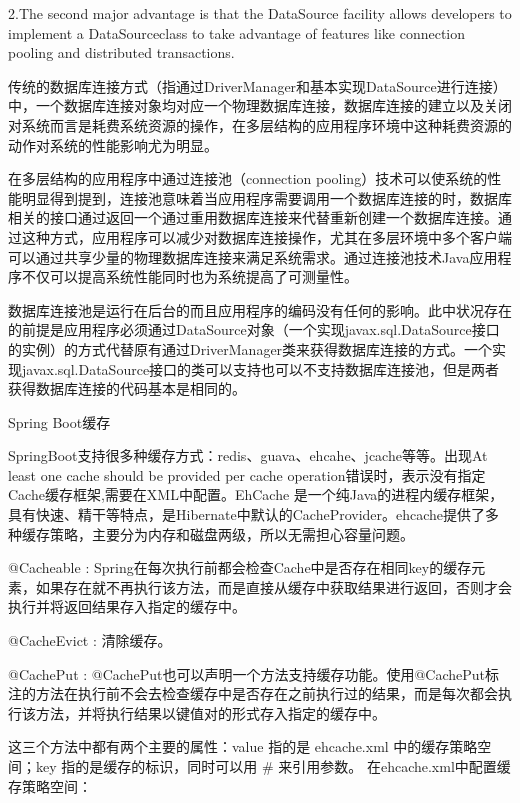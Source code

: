 \documentclass[11pt,fleqn]{book}
\makeatletter
\numberwithin{dummy}{section}
\theoremstyle{ocrenumbox}
\theoremstyle{blacknumex}
\theoremstyle{blacknumbox}
\theoremstyle{ocrenum}
\renewcommand{\subsection}{\@startsection {subsection}{2}{\z@}
	{-3ex \@plus -0.1ex \@minus -.4ex}
	{0.5ex \@plus.2ex }
	{\normalfont\sffamily\bfseries}}
\makeatother
\begin{document}
2.The second major advantage is that the DataSource facility allows developers to implement a DataSourceclass to take advantage of features like connection pooling and distributed transactions.

传统的数据库连接方式（指通过DriverManager和基本实现DataSource进行连接）中，一个数据库连接对象均对应一个物理数据库连接，数据库连接的建立以及关闭对系统而言是耗费系统资源的操作，在多层结构的应用程序环境中这种耗费资源的动作对系统的性能影响尤为明显。

在多层结构的应用程序中通过连接池（connection pooling）技术可以使系统的性能明显得到提到，连接池意味着当应用程序需要调用一个数据库连接的时，数据库相关的接口通过返回一个通过重用数据库连接来代替重新创建一个数据库连接。通过这种方式，应用程序可以减少对数据库连接操作，尤其在多层环境中多个客户端可以通过共享少量的物理数据库连接来满足系统需求。通过连接池技术Java应用程序不仅可以提高系统性能同时也为系统提高了可测量性。

数据库连接池是运行在后台的而且应用程序的编码没有任何的影响。此中状况存在的前提是应用程序必须通过DataSource对象（一个实现javax.sql.DataSource接口的实例）的方式代替原有通过DriverManager类来获得数据库连接的方式。一个实现javax.sql.DataSource接口的类可以支持也可以不支持数据库连接池，但是两者获得数据库连接的代码基本是相同的。

\subsection{Spring Boot缓存}

SpringBoot支持很多种缓存方式：redis、guava、ehcahe、jcache等等。出现At least one cache should be provided per cache operation错误时，表示没有指定Cache缓存框架,需要在XML中配置。EhCache 是一个纯Java的进程内缓存框架，具有快速、精干等特点，是Hibernate中默认的CacheProvider。ehcache提供了多种缓存策略，主要分为内存和磁盘两级，所以无需担心容量问题。

@Cacheable : Spring在每次执行前都会检查Cache中是否存在相同key的缓存元素，如果存在就不再执行该方法，而是直接从缓存中获取结果进行返回，否则才会执行并将返回结果存入指定的缓存中。 

@CacheEvict : 清除缓存。 

@CachePut : @CachePut也可以声明一个方法支持缓存功能。使用@CachePut标注的方法在执行前不会去检查缓存中是否存在之前执行过的结果，而是每次都会执行该方法，并将执行结果以键值对的形式存入指定的缓存中。 

这三个方法中都有两个主要的属性：value 指的是 ehcache.xml 中的缓存策略空间；key 指的是缓存的标识，同时可以用 \# 来引用参数。
在ehcache.xml中配置缓存策略空间：
\end{document}
